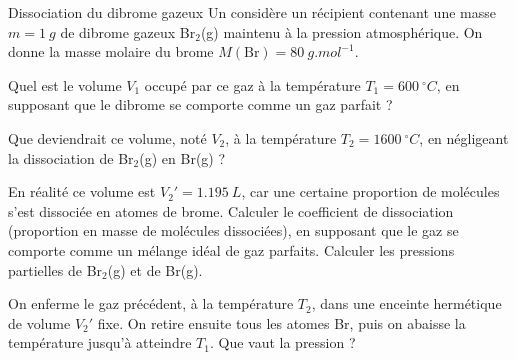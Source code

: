 \begin{exo}[MPSI]{Dissociation du dibrome gazeux}
Un considère un récipient contenant une masse $m=\SI{1}{g}$ de dibrome gazeux Br$_2$(g) maintenu à la pression atmosphérique. On donne la masse molaire du brome $M(\text{Br}) = \SI{80}{g.mol^{-1}}$.

\begin{quest}
\item Quel est le volume $V_1$ occupé par ce gaz à la température $T_1 = \SI{600}{^\circ C}$, en supposant que le dibrome se comporte comme un gaz parfait ?




\item Que deviendrait ce volume, noté $V_2$, à la température $T_2 = \SI{1600}{^\circ C}$, en négligeant la dissociation de Br$_2$(g) en Br(g) ?




\item En réalité ce volume est $V_2' = \SI{1.195}{L}$, car une certaine proportion de molécules s'est dissociée en atomes de brome. Calculer le coefficient de dissociation (proportion en masse de molécules dissociées), en supposant que le gaz se comporte comme un mélange idéal de gaz parfaits. Calculer les pressions partielles de Br$_2$(g) et de Br(g).


\item On enferme le gaz précédent, à la température $T_2$, dans une enceinte hermétique de volume $V_2'$ fixe. On retire ensuite tous les atomes Br, puis on abaisse la température jusqu'à atteindre $T_1$. Que vaut la pression ?

\end{quest}


\end{exo}

